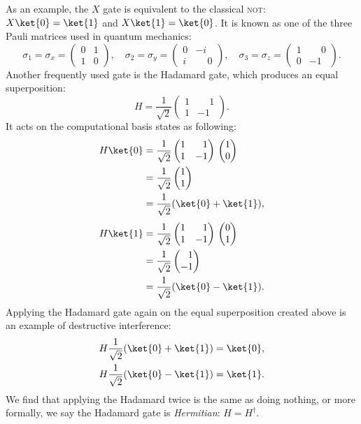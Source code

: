 \documentclass[a4paper,10pt]{article}
\newcommand{\qstatezero}{
	\begin{pmatrix}1 \\ 0\end{pmatrix}
}
\newcommand{\qstateone}{
	\begin{pmatrix}0 \\ 1\end{pmatrix}
}
\newcommand{\hgate}{
	\dfrac{1}{\sqrt2}
	\begin{pmatrix}
		1 & \phantom{-}1 \\
		1 & -1
	\end{pmatrix}
}
\begin{document}
As an example, the $X$ gate is equivalent to the classical \textsc{not}: $X\ket{0} = \ket{1}$ and $X\ket{1} = \ket{0}$.
It is known as one of the three Pauli matrices used in quantum mechanics:
\begin{equation} \label{eq:paulis}
\sigma_1 = \sigma_x =
\begin{pmatrix}
0 & 1 \\
1 & 0
\end{pmatrix},
\quad
\sigma_2 = \sigma_y =
\begin{pmatrix}
0 & -i \\
i & \phantom{-}0
\end{pmatrix},
\quad
\sigma_3 = \sigma_z =
\begin{pmatrix}
1 & \phantom{-}0 \\
0 & -1
\end{pmatrix}.
\end{equation}
Another frequently used gate is the Hadamard gate, which produces an equal superposition:
\begin{equation}
H = \hgate{}.
\end{equation}
It acts on the computational basis states as following:
\begin{equation}
\begin{aligned}
H\ket{0} &=
\hgate{}
\qstatezero{} \\
&=
\dfrac{1}{\sqrt2}
\begin{pmatrix}1 \\ 1\end{pmatrix} \\
&= \dfrac{1}{\sqrt2}(\ket{0} + \ket{1}),
\end{aligned}
\end{equation}
\begin{equation}
\begin{aligned}
H\ket{1} &=
\hgate{}
\qstateone{} \\
&=
\dfrac{1}{\sqrt2}
\begin{pmatrix}\phantom{-}1 \\ -1\end{pmatrix} \\
&= \dfrac{1}{\sqrt2}(\ket{0} - \ket{1}).
\end{aligned}
\end{equation}
Applying the Hadamard gate again on the equal superposition created above is an example of destructive interference:
\begin{align}
H\dfrac{1}{\sqrt2}(\ket{0} + \ket{1}) &= \ket{0}, \\
H\dfrac{1}{\sqrt2}(\ket{0} - \ket{1}) &= \ket{1}.
\end{align}
We find that applying the Hadamard twice is the same as doing nothing, or more formally, we say the Hadamard gate is \emph{Hermitian}: $H = H^\dagger$.
\end{document}
